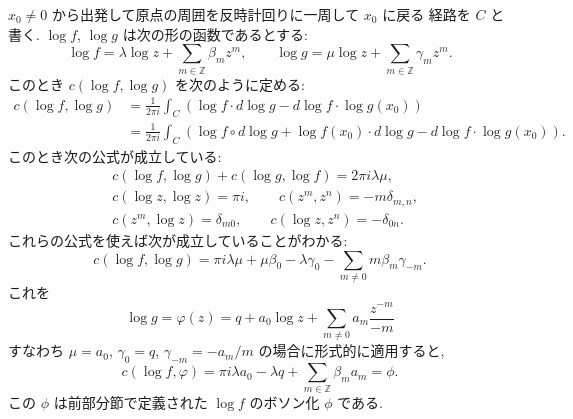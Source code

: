 \documentclass[12pt,twoside]{jarticle}
\newcommand\Z{{\mathbb Z}} %
\theoremstyle{definition} %
\theoremstyle{definition} %
\theoremstyle{definition} %
\numberwithin{theorem}{section}
\numberwithin{equation}{section}
\numberwithin{figure}{section}
\numberwithin{table}{section}
\begin{document}
$x_0\ne 0$ から出発して原点の周囲を反時計回りに一周して $x_0$ に戻る
経路を $C$ と書く. $\log f$, $\log g$ は次の形の函数であるとする:
\[
\log f = \lambda\log z+\sum_{m\in\Z} \beta_m  z^m, \qquad
\log g = \mu\log z    +\sum_{m\in\Z} \gamma_m z^m.
\]
このとき $c(\log f,\log g)$ を次のように定める:
\begin{align*}
c(\log f,\log g)
&
=\frac{1}{2\pi i}
\int_C(\log f\cdot d\log g - d\log f\cdot\log g(x_0))
\\ &
=\frac{1}{2\pi i}
\int_C(\log f\circ d\log g + \log f(x_0)\cdot d\log g- d\log f\cdot\log g(x_0)).
\end{align*}
このとき次の公式が成立している:
\begin{align*}
&
c(\log f,\log g)+c(\log g,\log f)=2\pi i\lambda\mu,
\\ &
c(\log z,\log z)=\pi i, \qquad
c(z^m,z^n) = -m\delta_{m,n},
\\ &
c(z^m,\log z) = \delta_{m0}, \qquad
c(\log z, z^n) = -\delta_{0n}.
\end{align*}
これらの公式を使えば次が成立していることがわかる:
\[
c(\log f,\log g)
= \pi i \lambda\mu + \mu\beta_0 - \lambda \gamma_0
- \sum_{m\ne 0} m\beta_m\gamma_{-m}.
\]
これを
\[
\log g = \varphi(z) = q + a_0\log z + \sum_{m\ne 0}a_m\frac{z^{-m}}{-m}
\]
すなわち $\mu=a_0$, $\gamma_0=q$, $\gamma_{-m}=-a_m/m$
の場合に形式的に適用すると,
\[
c(\log f,\varphi)
= \pi i \lambda a_0 -\lambda q +\sum_{m\in\Z}\beta_m a_m
= \phi.
\]
この $\phi$ は前部分節で定義された $\log f$ のボソン化 $\phi$ である.


\end{document}
